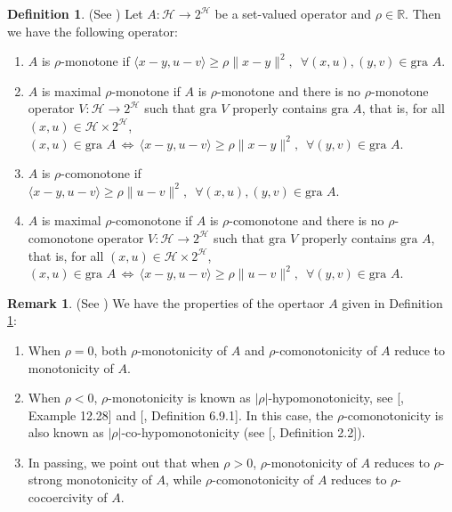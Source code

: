 \documentclass{article}
\theoremstyle{definition}
\theoremstyle{definition}
\newtheorem{definition}{Definition}[section]
\theoremstyle{definition}
\newtheorem{remark}{Remark}[section]
\newcommand{\Hilbert}{\mathcal{H}}
\newcommand{\R}{\mathbb{R}}
\begin{document}
\begin{definition}
{\rm (See \cite[Definition 2.4]{bauschke2021generalized})}
\label{def_1}
Let $A: \Hilbert \to 2^\Hilbert$ be a set-valued operator and $\rho \in \R$. Then we have the following operator:
\begin{enumerate}
    \item[(1)] $A$ is $\rho$-monotone if
    $
    \langle x-y, u-v \rangle \geq \rho \|x-y\|^2, \,\,\,\forall (x,u),   (y,v) \in \text{gra } A.
   $
    \item[(2)] $A$ is maximal $\rho$-monotone if $A$ is $\rho$-monotone and there is no $\rho$-monotone operator  $V: \Hilbert \to 2^\Hilbert$  such that $\text{gra } V$ properly contains $\text{gra } A$, that is, for all $(x,u) \in \Hilbert \times  2^\Hilbert$,
    $
    (x,u) \in \text{gra } A\, \Longleftrightarrow\, \langle x-y, u-v \rangle \geq \rho \|x-y\|^2,\,\,\,\forall (y,v) \in \text{gra } A.
    $
    \item[(3)] $A$ is $\rho$-comonotone if
    $
    \langle x-y, u-v \rangle \geq \rho \|u-v\|^2, \,\,\,\forall (x,u),  (y,v) \in \text{gra } A.
    $
    \item[(4)] $A$ is maximal $\rho$-comonotone if $A$ is $\rho$-comonotone and there is no $\rho$-comonotone operator $V: \Hilbert\to  2^\Hilbert$ such that $\text{gra } V$ properly contains $\text{gra } A$, that is, for all $(x,u) \in \Hilbert \times  2^\Hilbert$,
    $
    (x,u) \in \text{gra } A\, \Longleftrightarrow\,  \langle x-y, u-v \rangle \geq \rho \|u-v\|^2,\,\,\,\forall (y,v) \in \text{gra } A.
   $
\end{enumerate}
\end{definition}

\begin{remark} (See \cite[Remark 2.5]{bauschke2021generalized})
\label{rem:comonotone}  We have the properties of the opertaor $A$ given in Definition \ref{def_1}:
\leavevmode
\begin{enumerate} 
\item[(1)] When $\rho = 0$, both $\rho$-monotonicity of $A$ and $\rho$-comonotonicity of $A$ reduce to monotonicity of $A$.
\item[(2)] When $\rho < 0$, $\rho$-monotonicity is known as $|\rho|$-hypomonotonicity, see [\cite{rockafellar2009variational}, Example 12.28] and [\cite{burachik2008}, Definition 6.9.1]. In this case, the $\rho$-comonotonicity is also known as $|\rho|$-co-hypomonotonicity (see [\cite{combettes2004}, Definition 2.2]).
\item[(3)] In passing, we point out that when $\rho > 0$, $\rho$-monotonicity of $A$ reduces to $\rho$-strong monotonicity of $A$, while $\rho$-comonotonicity of $A$ reduces to $\rho$-cocoercivity of $A$.
\end{enumerate}
\end{remark}
\end{document}
